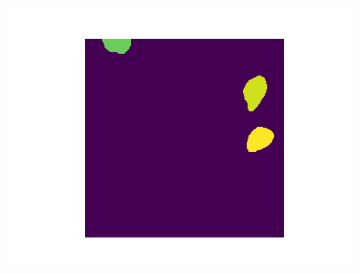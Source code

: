 \documentclass[target=bach,aauheader=,style=]{thud}
\begin{document}
\begin{figure}[ht]
\begin{subfigure}{0.32\textwidth}
  \includegraphics[width=\linewidth]{imgs/dataset/connect.png}
  \caption{}
\end{subfigure}

\vspace{0.4em}


\end{figure}
\end{document}
